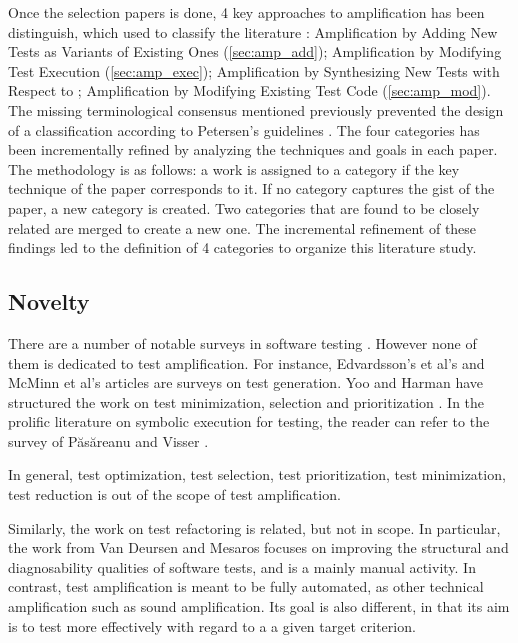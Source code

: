 Once the selection papers is done, 4 key approaches to amplification has been distinguish, which used to classify the literature : 
Amplification by Adding New Tests as Variants of Existing Ones (\autoref{sec:amp_add});
Amplification by Modifying Test Execution (\autoref{sec:amp_exec});
Amplification by Synthesizing New Tests with Respect to ; 
Amplification by Modifying Existing Test Code (\autoref{sec:amp_mod}).
The missing terminological consensus mentioned previously prevented the design of a classification according to Petersen's guidelines
\cite{petersen2008systematic}.
The four categories has been incrementally refined by analyzing the techniques and goals in each paper.
The methodology is as follows: a work is assigned to a category if the key technique of the paper corresponds to it.
If no category captures the gist of the paper, a new category is created.
Two categories that are found to be closely related are merged to create a new one.
The incremental refinement of these findings led to the definition of 4 categories to organize this literature study.

\subsection{Novelty}


There are a number of notable surveys in software testing \cite{edvardsson1999survey,mcminn2004search,anand2013orchestrated}. 
However none of them is dedicated to test amplification.
For instance, Edvardsson's et al's \cite{edvardsson1999survey} and McMinn et al's \cite{mcminn2004search} articles are surveys on test generation.
Yoo and Harman have structured the work on test minimization, selection and prioritization \cite{yoo2012survey} .
In the prolific literature on symbolic execution for testing, the reader can refer to the survey of 
Păsăreanu and Visser \cite{puasuareanu2009survey}.

In general, test optimization, test selection, test prioritization, test minimization, test reduction is out of the scope of test amplification.

Similarly, the work on test refactoring is related, but not in scope. 
In particular, the work from Van Deursen \etal\cite{vandeursen2001refactoring,DBLP:series/springer/MoonenDZB08} and Mesaros\cite{Meszaros2006} focuses on improving the structural and diagnosability qualities of software tests, and is a mainly manual activity. 
In contrast, test amplification is meant to be fully automated, as other technical amplification such as sound amplification. 
Its goal is also different, in that its aim is to test more effectively with regard to a a given target criterion.

